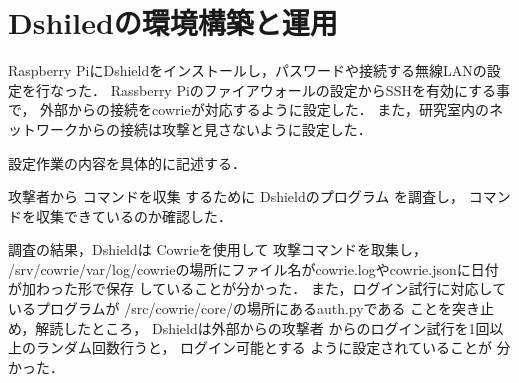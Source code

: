 \documentclass[dvipdfmx]{bta}
\begin{document}
\chapter{Dshiledの環境構築と運用}

Raspberry PiにDshieldをインストールし，パスワードや接続する無線LANの設定を行なった．
Rassberry Piのファイアウォールの設定からSSHを有効にする事で，
外部からの接続をcowrieが対応するように設定した．
また，研究室内のネットワークからの接続は攻撃と見さないように設定した．

設定作業の内容を具体的に記述する．

攻撃者から
コマンドを収集
するために
Dshieldのプログラム
を調査し，
コマンドを収集できているのか確認した．


調査の結果，Dshieldは
Cowrie\cite{Cowrie}を使用して
攻撃コマンドを取集し，
/srv/cowrie/var/log/cowrieの場所にファイル名がcowrie.logやcowrie.jsonに日付が加わった形で保存
していることが分かった．
また，ログイン試行に対応しているプログラムが
/src/cowrie/core/の場所にあるauth.pyである
ことを突き止め，解読したところ，
Dshieldは外部からの攻撃者
からのログイン試行を1回以上のランダム回数行うと，
ログイン可能とする
ように設定されていることが
分かった．

\end{document}
